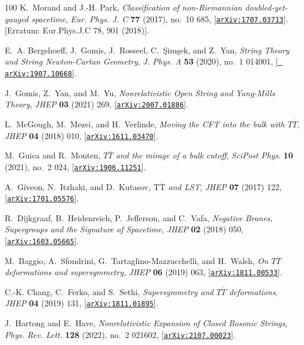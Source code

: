 \documentclass[11pt]{article}
\begin{document}
\begin{thebibliography}{100}
K.~Morand and J.-H. Park, {\it {Classification of non-Riemannian
  doubled-yet-gauged spacetime}},  {\em Eur. Phys. J. C} {\bf 77} (2017),
  no.~10 685, [\href{http://arxiv.org/abs/1707.03713}{{\tt arXiv:1707.03713}}].
  [Erratum: Eur.Phys.J.C 78, 901 (2018)].

E.~A. Bergshoeff, J.~Gomis, J.~Rosseel, C.~\c{S}im\c{s}ek, and Z.~Yan, {\it
  {String Theory and String Newton-Cartan Geometry}},  {\em J. Phys. A} {\bf
  53} (2020), no.~1 014001, [\href{http://arxiv.org/abs/1907.10668}{{\tt
  arXiv:1907.10668}}].

J.~Gomis, Z.~Yan, and M.~Yu, {\it {Nonrelativistic Open String and Yang-Mills
  Theory}},  {\em JHEP} {\bf 03} (2021) 269,
  [\href{http://arxiv.org/abs/2007.01886}{{\tt arXiv:2007.01886}}].

L.~McGough, M.~Mezei, and H.~Verlinde, {\it {Moving the CFT into the bulk with
  $ T\overline{T} $}},  {\em JHEP} {\bf 04} (2018) 010,
  [\href{http://arxiv.org/abs/1611.03470}{{\tt arXiv:1611.03470}}].

M.~Guica and R.~Monten, {\it {$T\bar T$ and the mirage of a bulk cutoff}},
  {\em SciPost Phys.} {\bf 10} (2021), no.~2 024,
  [\href{http://arxiv.org/abs/1906.11251}{{\tt arXiv:1906.11251}}].

A.~Giveon, N.~Itzhaki, and D.~Kutasov, {\it {$ \mathrm{T}\overline{\mathrm{T}}
  $ and LST}},  {\em JHEP} {\bf 07} (2017) 122,
  [\href{http://arxiv.org/abs/1701.05576}{{\tt arXiv:1701.05576}}].

R.~Dijkgraaf, B.~Heidenreich, P.~Jefferson, and C.~Vafa, {\it {Negative Branes,
  Supergroups and the Signature of Spacetime}},  {\em JHEP} {\bf 02} (2018)
  050, [\href{http://arxiv.org/abs/1603.05665}{{\tt arXiv:1603.05665}}].

M.~Baggio, A.~Sfondrini, G.~Tartaglino-Mazzucchelli, and H.~Walsh, {\it {On $
  T\overline{T} $ deformations and supersymmetry}},  {\em JHEP} {\bf 06} (2019)
  063, [\href{http://arxiv.org/abs/1811.00533}{{\tt arXiv:1811.00533}}].

C.-K. Chang, C.~Ferko, and S.~Sethi, {\it {Supersymmetry and $ T\overline{T} $
  deformations}},  {\em JHEP} {\bf 04} (2019) 131,
  [\href{http://arxiv.org/abs/1811.01895}{{\tt arXiv:1811.01895}}].

J.~Hartong and E.~Have, {\it {Nonrelativistic Expansion of Closed Bosonic
  Strings}},  {\em Phys. Rev. Lett.} {\bf 128} (2022), no.~2 021602,
  [\href{http://arxiv.org/abs/2107.00023}{{\tt arXiv:2107.00023}}].


\end{thebibliography}
\end{document}
